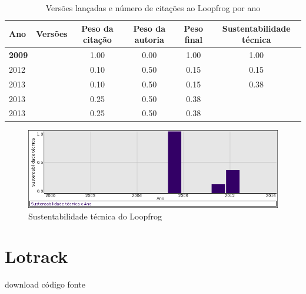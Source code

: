 \begin{table}[H]
\caption{Versões lançadas e número de citações ao Loopfrog por ano}
\centering
\begin{tabular}{| l | c | c | c | c | c |}
  \hline
  Ano & Versões & Peso da citação & Peso da autoria & Peso final & Sustentabilidade técnica \\
  \hline
            {\bf 2009}
          &
          
          &
          1.00
          &
          0.00
          &
          1.00
          &
            {\color{blue} 1.00}
          \\
\hline
            2012
          &
          
          &
          0.10
          &
          0.50
          &
          0.15
          &
            {\color{red} 0.15}
          \\
\hline
            2013
          &
          
          &
          0.10
          &
          0.50
          &
          0.15
          &
            {\color{red} 0.38}
          \\
            2013
          &
          
          &
          0.25
          &
          0.50
          &
          0.38
          &
          \\
            2013
          &
          
          &
          0.25
          &
          0.50
          &
          0.38
          &
          \\
\hline
\end{tabular}
\end{table}

\begin{figure}[h]
  \center
  \includegraphics[scale=0.50]{imagens/softwares-charts/loopfrog.png}
  \caption{Sustentabilidade técnica do Loopfrog}
\end{figure}


\section{Lotrack}
\checkmark download
\checkmark código fonte


